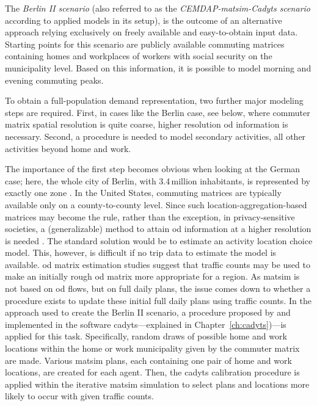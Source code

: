 The \textit{Berlin II scenario} (also referred to as the \emph{CEMDAP-\gls{matsim}-Cadyts scenario} according to applied models in its setup), is the outcome of an alternative approach relying exclusively on freely available and easy-to-obtain input data. Starting points for this scenario are publicly available commuting matrices containing homes and workplaces of workers with social security on the municipality level. Based on this information, it is possible to model morning and evening commuting peaks.

To obtain a full-population demand representation, two further major modeling steps are required. First, in cases like the Berlin case, see below, where commuter matrix spatial resolution is quite coarse, higher resolution \gls{od} information is necessary. Second, a procedure is needed to model secondary activities, \ie all other activities beyond home and work.

The importance of the first step becomes obvious when looking at the German case; here, the whole city of Berlin, with 3.4\,million inhabitants, is represented by exactly one zone \citep{BA2010Pendlerstatistik}. In the United States, commuting matrices are typically available only on a county-to-county level. Since such location-aggregation-based matrices may become the rule, rather than the exception, in privacy-sensitive societies, a (generalizable) method to attain \gls{od} information at a higher resolution is needed \citep{ZiemkeNagelBhatIntegratingCemdapMatsimTransferability}. The standard solution would be to estimate an activity location choice model. This, however, is difficult if no trip data to estimate the model is available. \gls{od} matrix estimation studies \citep{ZuylenWillumsenMatrix-from-cnts} suggest that traffic counts may be used to make an initially rough \gls{od} matrix more appropriate for a region. As \gls{matsim} is not based on \gls{od} flows, but on full daily plans, the issue comes down to whether a procedure exists to update these initial full daily plans using traffic counts. In the approach used to create the Berlin II scenario, a procedure proposed by \citet{floetteroed-2010e} and implemented in the software \gls{cadyts}---explained in Chapter~\ref{ch:cadyts})---is applied for this task. Specifically, random draws of possible home and work locations within the home or work municipality given by the commuter matrix are made. Various \gls{matsim} plans, each containing one pair of home and work locations, are created for each agent. Then, the \gls{cadyts} calibration procedure is applied within the iterative \gls{matsim} simulation to select plans and locations more likely to occur with given traffic counts.

